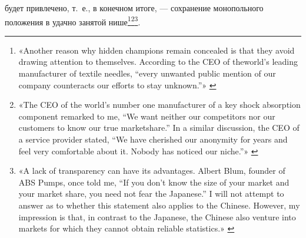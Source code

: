 \documentclass{article}
\begin{document}
будет привлечено, т.~е., в конечном итоге, — сохранение монопольного положения в удачно занятой нише\footnote{«Another reason why hidden champions remain concealed is that they avoid drawing attention to themselves. According to the CEO of theworld’s leading manufacturer of textile needles, “every unwanted public mention of our company counteracts our efforts to stay unknown.”» \cite{hiddenChampions2009}}\footnote{«The CEO of the world’s number one manufacturer of a key shock absorption component remarked to me, “We want neither our competitors nor our customers to know our true marketshare.” In a similar discussion, the CEO of a service provider stated, “We have cherished our anonymity for years and feel very comfortable about it. Nobody has noticed our niche.”» \cite{hiddenChampions2009}}\footnote{«A lack of transparency can have its advantages. Albert Blum, founder of ABS Pumps, once told me, “If you don’t know the size of your market and your market share, you need not fear the Japanese.” I will not attempt to answer as to whether this statement also applies to the Chinese. However, my impression is that, in contrast to the Japanese, the Chinese also venture into markets for which they cannot obtain reliable statistics.» \cite{hiddenChampions2009}}.
\end{document}
